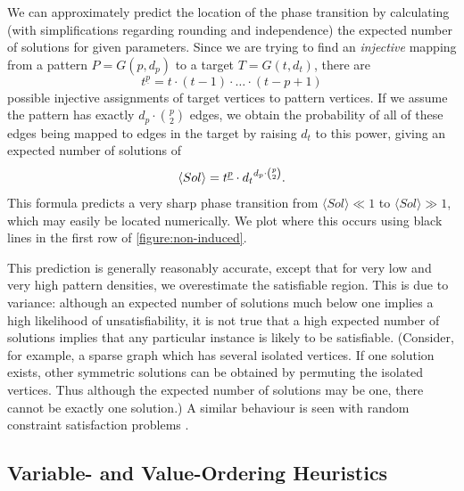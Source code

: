 \documentclass[twoside,11pt]{article}
\begin{document}
We can approximately predict the location of the phase transition by calculating (with
simplifications regarding rounding and independence) the expected number of solutions for given
parameters. Since we are trying to find an \emph{injective} mapping from a pattern $P = G(p, d_p)$
to a target $T = G(t, d_t)$, there are \[ t^{\underline{p}} = t \cdot (t - 1) \cdot \ldots \cdot (t
- p + 1) \] possible injective assignments of target vertices to pattern vertices.  If we assume the
pattern has exactly $d_p \cdot \binom{p}{2}$ edges, we obtain the probability of all of these edges
being mapped to edges in the target by raising $d_t$ to this power, giving an expected number of
solutions of \begin{equation}\label{equation:non-induced-prediction} \langle Sol \rangle =
t^{\underline{p}} \cdot {d_t}^{d_p \cdot \binom{p}{2}} \textnormal{.} \end{equation} This formula
predicts a very sharp phase transition from $\langle Sol \rangle \ll 1$ to $\langle Sol \rangle \gg
1$, which may easily be located numerically. We plot where this occurs using black lines in the
first row of \cref{figure:non-induced}.

This prediction is generally reasonably accurate, except that for very low and very high pattern
densities, we overestimate the satisfiable region. This is due to variance: although an expected
number of solutions much below one implies a high likelihood of unsatisfiability, it is not true
that a high expected number of solutions implies that any particular instance is likely to be
satisfiable. (Consider, for example, a sparse graph which has several isolated vertices. If one
solution exists, other symmetric solutions can be obtained by permuting the isolated vertices.
Thus although the expected number of solutions may be one, there cannot be exactly one solution.) A
similar behaviour is seen with random constraint satisfaction problems
\cite{DBLP:journals/ai/SmithD96}.

\subsection{Variable- and Value-Ordering Heuristics}
\end{document}
